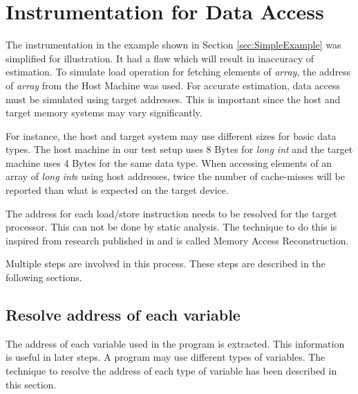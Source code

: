 \section{Instrumentation for Data Access}
The instrumentation in the example shown in Section \ref{sec:SimpleExample} was simplified for illustration. It had a flaw which will result in inaccuracy of estimation. To simulate load operation for fetching elements of \emph{array}, the address of \emph{array} from the Host Machine was used. For accurate estimation, data access must be simulated using target addresses. This is important since the host and target memory systems may vary significantly. 

For instance, the host and target system may use different sizes for basic data types. The host machine in our test setup uses 8 Bytes for \emph{long int} and the target machine uses 4 Bytes for the same data type. When accessing elements of an array of \emph{long int}s using host addresses, twice the number of cache-misses will be reported than what is expected on the target device.

The address for each load/store instruction needs to be resolved for the target processor. This can not be done by static analysis. The technique to do this is inspired from research published in \cite{Lu2013} and is called Memory Access Reconstruction. 

Multiple steps are involved in this process. These steps are described in the following sections.

%

\subsection{Resolve address of each variable}
The address of each variable used in the program is extracted. This information is useful in later steps. A program may use different types of variables. The technique to resolve the address of each type of variable has been described in this section.


